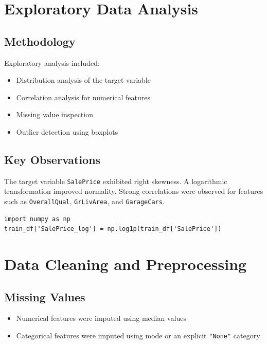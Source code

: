 \documentclass[a4paper]{article}
\begin{document}
\section*{Exploratory Data Analysis}

\subsection*{Methodology}

Exploratory analysis included:
\begin{itemize}
    \item Distribution analysis of the target variable
    \item Correlation analysis for numerical features
    \item Missing value inspection
    \item Outlier detection using boxplots
\end{itemize}

\subsection*{Key Observations}

The target variable \texttt{SalePrice} exhibited right skewness. A logarithmic transformation improved normality. Strong correlations were observed for features such as \texttt{OverallQual}, \texttt{GrLivArea}, and \texttt{GarageCars}.

\begin{verbatim}
import numpy as np
train_df['SalePrice_log'] = np.log1p(train_df['SalePrice'])
\end{verbatim}

\section*{Data Cleaning and Preprocessing}

\subsection*{Missing Values}

\begin{itemize}
    \item Numerical features were imputed using median values
    \item Categorical features were imputed using mode or an explicit \texttt{"None"} category
\end{itemize}
\end{document}
